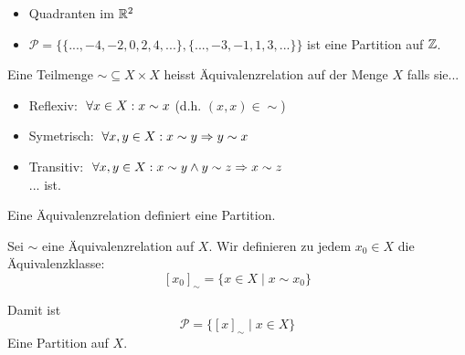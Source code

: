 \documentclass[main.tex]{subfiles}
\begin{document}
\begin{Beispiel}
  \begin{itemize}
    \item Quadranten im $\mathbb{R}^2$
    \item $\mathcal{P} = \{ \{ ..., -4,-2,0,2,4,...\} , \{ ...,-3,-1,1,3,... \} \}$ ist eine Partition auf $\mathbb{Z}$.
  \end{itemize}
\end{Beispiel}

\begin{Definition}[Äquivalenzrelation]
  Eine Teilmenge $\sim \subseteq X \times X$ heisst Äquivalenzrelation auf der Menge $X$ falls sie...
  \begin{itemize}
    \item Reflexiv: $\;\forall x \in X : x \sim x $ (d.h. $(x,x)\in \sim$)
    \item Symetrisch: $\;\forall x,y\in X: x \sim y \Rightarrow y \sim x$
    \item Transitiv: $\;\forall x,y \in X: x\sim y \land y\sim z \Rightarrow x\sim z$
    \\... ist.
  \end{itemize}
\end{Definition}

\begin{Theorem}
  Eine Äquivalenzrelation definiert eine Partition.
  \begin{Definition}[Äquivalenzklasse]
    Sei $\sim$ eine Äquivalenzrelation auf $X$. Wir definieren zu jedem $x_0 \in X$ die Äquivalenzklasse:
    $$[x_0]_\sim = \{ x \in X \mid x \sim x_0 \}$$
  \end{Definition}
  Damit ist
  $$\mathcal{P} = \{ [x]_\sim \mid x \in X \}$$
  Eine Partition auf $X$.
\end{Theorem}
\end{document}
